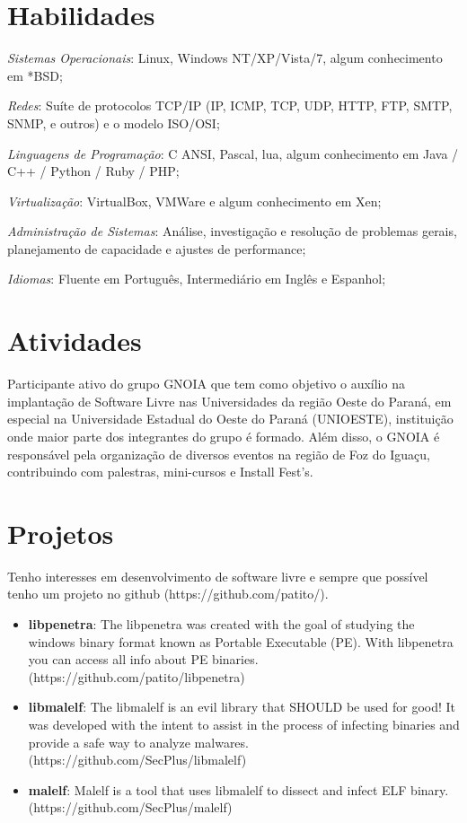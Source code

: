 \documentclass[margin]{res}
\begin{document}
\begin{resume}
\section{Habilidades}  \textit{Sistemas Operacionais}:  Linux, Windows NT/XP/Vista/7, algum conhecimento em *BSD;

			\textit{Redes}:  Suíte de protocolos TCP/IP (IP, ICMP, TCP, UDP, HTTP, FTP, SMTP, SNMP, e outros) e o modelo ISO/OSI;
  
			\textit{Linguagens de Programação}: C ANSI, Pascal, lua, algum conhecimento em Java / C++ / Python / Ruby / PHP;
  
			\textit{Virtualização}: VirtualBox, VMWare e algum conhecimento em Xen;

			\textit{Administração de Sistemas}:  Análise, investigação e resolução de problemas gerais, planejamento de capacidade e ajustes de performance;

			\textit{Idiomas}: Fluente em Português, Intermediário em Inglês e Espanhol;

 


\section{Atividades}
                Participante ativo do grupo GNOIA que tem como objetivo o auxílio na implantação de Software Livre nas Universidades da região Oeste do Paraná, em especial na Universidade Estadual do Oeste do Paraná (UNIOESTE), instituição onde maior parte dos integrantes do grupo é formado. Além disso, o GNOIA é responsável pela organização de diversos eventos na região de Foz do Iguaçu, contribuindo com palestras, mini-cursos e Install Fest's.
 
\section{Projetos}
		Tenho interesses em desenvolvimento de software livre e sempre que possível tenho um projeto no github (https://github.com/patito/).
		
		\begin{itemize}
		\vspace{2mm}
		\item \textbf{libpenetra}: The libpenetra was created with the goal of studying the windows binary format known as Portable Executable (PE).
		                     With libpenetra you can access all info about PE binaries. (https://github.com/patito/libpenetra)
		\vspace{2mm}                    
		\item \textbf{libmalelf}: The libmalelf is an evil library that SHOULD be used for good! It was developed with the intent to assist in the process
		                     of infecting binaries and provide a safe way to analyze malwares. (https://github.com/SecPlus/libmalelf)\vspace{2mm}
		\item \textbf{malelf}: Malelf is a tool that uses libmalelf to dissect and infect ELF binary. (https://github.com/SecPlus/malelf)
		\end{itemize}
 
\end{resume} 
\end{document}
